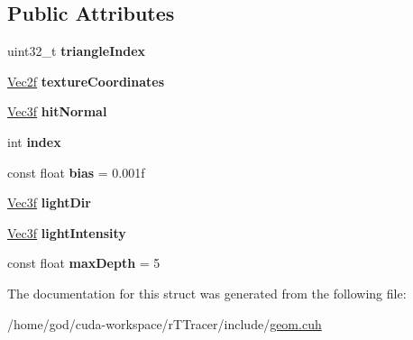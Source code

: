 \subsection*{Public Attributes}
\begin{DoxyCompactItemize}
\item 
uint32\+\_\+t {\bfseries triangle\+Index}\hypertarget{struct_g_p_u_1_1_rendering_context_a3f3cbd7668f1e3284e6d81a6ff45af15}{}\label{struct_g_p_u_1_1_rendering_context_a3f3cbd7668f1e3284e6d81a6ff45af15}

\item 
\hyperlink{class_vec2}{Vec2f} {\bfseries texture\+Coordinates}\hypertarget{struct_g_p_u_1_1_rendering_context_adb0db7d6cac7e75aac9022bc1a6e5d4c}{}\label{struct_g_p_u_1_1_rendering_context_adb0db7d6cac7e75aac9022bc1a6e5d4c}

\item 
\hyperlink{class_vec3}{Vec3f} {\bfseries hit\+Normal}\hypertarget{struct_g_p_u_1_1_rendering_context_ab52a46edf31d08fbb3e38b7e4973440e}{}\label{struct_g_p_u_1_1_rendering_context_ab52a46edf31d08fbb3e38b7e4973440e}

\item 
int {\bfseries index}\hypertarget{struct_g_p_u_1_1_rendering_context_aac9e3cc37208b4379d493b2ba669e33c}{}\label{struct_g_p_u_1_1_rendering_context_aac9e3cc37208b4379d493b2ba669e33c}

\item 
const float {\bfseries bias} = 0.\+001f\hypertarget{struct_g_p_u_1_1_rendering_context_a942e8aeb662e5b24f782c38fb172d99e}{}\label{struct_g_p_u_1_1_rendering_context_a942e8aeb662e5b24f782c38fb172d99e}

\item 
\hyperlink{class_vec3}{Vec3f} {\bfseries light\+Dir}\hypertarget{struct_g_p_u_1_1_rendering_context_a205c2dfe9842e0aea733e4bbb1da4e52}{}\label{struct_g_p_u_1_1_rendering_context_a205c2dfe9842e0aea733e4bbb1da4e52}

\item 
\hyperlink{class_vec3}{Vec3f} {\bfseries light\+Intensity}\hypertarget{struct_g_p_u_1_1_rendering_context_aa05e2be366dd8c157851ce8cbe00ed56}{}\label{struct_g_p_u_1_1_rendering_context_aa05e2be366dd8c157851ce8cbe00ed56}

\item 
const float {\bfseries max\+Depth} = 5\hypertarget{struct_g_p_u_1_1_rendering_context_a4b82358bf664122a391de3ff07519829}{}\label{struct_g_p_u_1_1_rendering_context_a4b82358bf664122a391de3ff07519829}

\end{DoxyCompactItemize}


The documentation for this struct was generated from the following file\+:\begin{DoxyCompactItemize}
\item 
/home/god/cuda-\/workspace/r\+T\+Tracer/include/\hyperlink{r_t_tracer_2include_2geom_8cuh}{geom.\+cuh}\end{DoxyCompactItemize}
